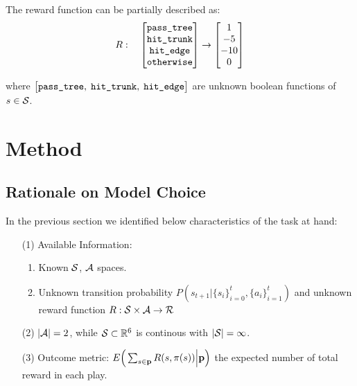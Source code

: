 \documentclass[11pt]{article}
\theoremstyle{definition}
\begin{document}
The reward function can be partially described as:
\begin{align*}
R: \quad
\begin{bmatrix}
\mbox{{\tt pass\_tree}} \\
\mbox{{\tt hit\_trunk}} \\
\mbox{{\tt hit\_edge}} \\
\mbox{{\tt otherwise}} \\
\end{bmatrix}
\rightarrow
\begin{bmatrix}
1 \\ -5 \\ -10 \\ 0
\end{bmatrix}
\end{align*}

where $\big[ \mbox{{\tt pass\_tree}}, \; \mbox{{\tt hit\_trunk}}, \; \mbox{{\tt hit\_edge}} \big]$ are unknown boolean functions of $s\in {\cal S}$.

\newpage
\section{\textbf{Method}}

\subsection{\textbf{Rationale on Model Choice}}
In the previous section we identified below characteristics of the task at hand:
\begin{enumerate}
\item [(1)] Available Information:
\begin{enumerate}
\item Known ${\cal S}$, ${\cal A}$ spaces. 
\item Unknown transition probability $P(s_{t+1} \big| \{s_i\}_{i=0}^{t}, \{a_i\}_{i=1}^{t})$ and unknown reward function $R: {\cal S} \times {\cal A} \rightarrow {\cal R}$
\end{enumerate}
\item [(2)] $|{\cal A}| = 2$, while ${\cal S} \subset \mathbb{R}^6$ is continous with $|{\cal S}| = \infty$. 
\item [(3)] Outcome metric: 
$E \Big( \sum_{s \in {\bf p}} R(s, \pi(s)) \Big| {\bf p} \Big)$ the expected number of total reward in each play.
\end{enumerate}
\end{document}
